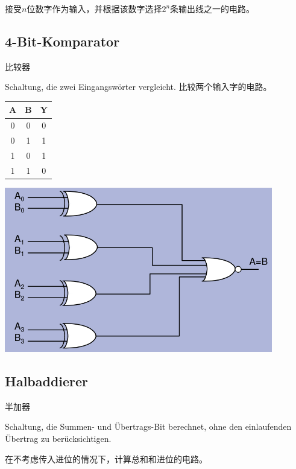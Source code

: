 \documentclass[fleqn]{article}
\begin{document}
接受$n$位数字作为输入，并根据该数字选择$2^n$条输出线之一的电路。

\subsection{4-Bit-Komparator} 比较器

Schaltung, die zwei Eingangswörter vergleicht. 比较两个输入字的电路。

\begin{center}
    \begin{tabular}{|c|c|c|}
        \hline
        A&B&Y\\
        \hline
        0&0&0\\
        0&1&1\\
        1&0&1\\
        1&1&0\\
        \hline
    \end{tabular}
\end{center}

\begin{center}
    \includegraphics[scale=0.6]{3.png}
\end{center}

\subsection{Halbaddierer} 半加器

Schaltung, die Summen- und Übertrags-Bit berechnet, ohne den einlaufenden Übertrag zu berücksichtigen.

在不考虑传入进位的情况下，计算总和和进位的电路。
\end{document}
